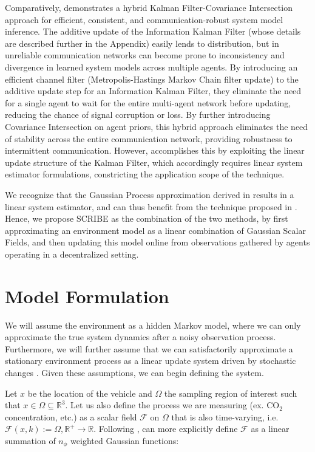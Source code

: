 Comparatively, \cite{tamjidi2021unifying} demonstrates a hybrid Kalman Filter-Covariance Intersection approach for efficient, consistent, and communication-robust system model inference. The additive update of the  Information Kalman Filter (whose details are described further in the Appendix) easily lends to distribution, but in unreliable communication networks can become prone to inconsistency and divergence in learned system models across multiple agents. By introducing an efficient channel filter (Metropolis-Hastings Markov Chain filter update) to the additive update step for an Information Kalman Filter, they eliminate the need for a single agent to wait for the entire multi-agent network before updating, reducing the chance of signal corruption or loss. By further introducing Covariance Intersection on agent priors, this hybrid approach eliminates the need of stability across the entire communication network, providing robustness to intermittent communication. However, \cite{tamjidi2021unifying} accomplishes this by exploiting the linear update structure of the Kalman Filter, which accordingly requires linear system estimator formulations, constricting the application scope of the technique.

We recognize that the Gaussian Process approximation derived in \cite{jadaliha2012environmental} results in a linear system estimator, and can thus benefit from the technique proposed in \cite{tamjidi2021unifying}. Hence, we propose SCRIBE as the combination of the two methods, by first approximating an environment model as a linear combination of Gaussian Scalar Fields, and then updating this model online from observations gathered by agents operating in a decentralized setting.

\section{Model Formulation} \label{sec:env-model-formula}

We will assume the environment as a hidden Markov model, where we can only approximate the true system dynamics after a noisy observation process. Furthermore, we will further assume that we can satisfactorily approximate a stationary environment process as a linear update system driven by stochastic changes \cite{jadaliha2012environmental}. Given these assumptions, we can begin defining the system.

Let $x$ be the location of the vehicle and $\Omega$ the sampling region of interest such that $x\in\Omega\subseteq\mathbb{R}^3$. Let us also define the process we are measuring (ex. $\text{CO}_2$ concentration, etc.) as a scalar field $\mathcal{F}$ on $\Omega$ that is also time-varying, i.e. $\mathcal{F}(x,k):=\Omega,\mathbb{R}^+\rightarrow\mathbb{R}$. Following \cite{jadaliha2012environmental}, can more explicitly define $\mathcal{F}$ as a linear summation of $n_{\phi}$ weighted Gaussian functions:

